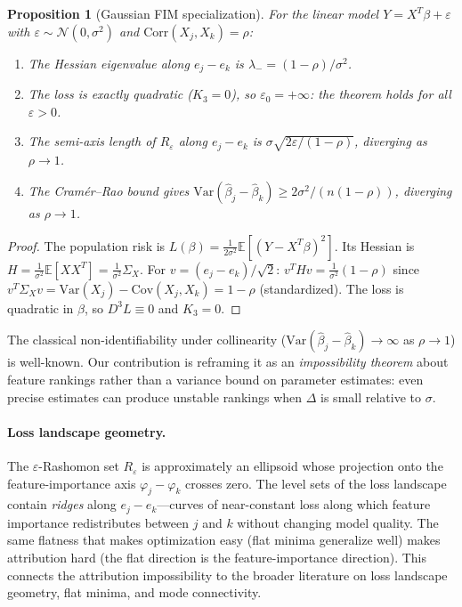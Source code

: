 \documentclass{article}
\newtheorem{proposition}[theorem]{Proposition}
\newcommand{\E}{\mathbb{E}}
\newcommand{\Var}{\mathrm{Var}}
\begin{document}
\begin{proposition}[Gaussian FIM specialization]
\label{prop:gaussian-fim}
For the linear model $Y = X^T\beta + \varepsilon$ with $\varepsilon \sim \mathcal{N}(0, \sigma^2)$ and $\text{Corr}(X_j, X_k) = \rho$:
\begin{enumerate}
    \item The Hessian eigenvalue along $e_j - e_k$ is $\lambda_- = (1-\rho)/\sigma^2$.
    \item The loss is exactly quadratic ($K_3 = 0$), so $\varepsilon_0 = +\infty$: the theorem holds for \emph{all} $\varepsilon > 0$.
    \item The semi-axis length of $R_\varepsilon$ along $e_j - e_k$ is $\sigma\sqrt{2\varepsilon/(1-\rho)}$, diverging as $\rho \to 1$.
    \item The Cram\'er--Rao bound gives $\Var(\hat\beta_j - \hat\beta_k) \geq 2\sigma^2/(n(1-\rho))$, diverging as $\rho \to 1$.
\end{enumerate}
\end{proposition}

\begin{proof}
The population risk is $L(\beta) = \frac{1}{2\sigma^2}\E[(Y-X^T\beta)^2]$. Its Hessian is $H = \frac{1}{\sigma^2}\E[XX^T] = \frac{1}{\sigma^2}\Sigma_X$. For $v = (e_j - e_k)/\sqrt{2}$: $v^T H v = \frac{1}{\sigma^2}(1-\rho)$ since $v^T \Sigma_X v = \Var(X_j) - \text{Cov}(X_j,X_k) = 1-\rho$ (standardized). The loss is quadratic in $\beta$, so $D^3 L \equiv 0$ and $K_3 = 0$.
\end{proof}

The classical non-identifiability under collinearity ($\Var(\hat\beta_j - \hat\beta_k) \to \infty$ as $\rho \to 1$) is well-known. Our contribution is reframing it as an \emph{impossibility theorem} about feature rankings rather than a variance bound on parameter estimates: even precise estimates can produce unstable rankings when $\Delta$ is small relative to $\sigma$.

\paragraph{Loss landscape geometry.}
The $\varepsilon$-Rashomon set $R_\varepsilon$ is approximately an ellipsoid whose projection onto the feature-importance axis $\varphi_j - \varphi_k$ crosses zero. The level sets of the loss landscape contain \emph{ridges} along $e_j - e_k$---curves of near-constant loss along which feature importance redistributes between $j$ and $k$ without changing model quality. The same flatness that makes optimization easy (flat minima generalize well) makes attribution hard (the flat direction is the feature-importance direction). This connects the attribution impossibility to the broader literature on loss landscape geometry, flat minima, and mode connectivity.
\end{document}
